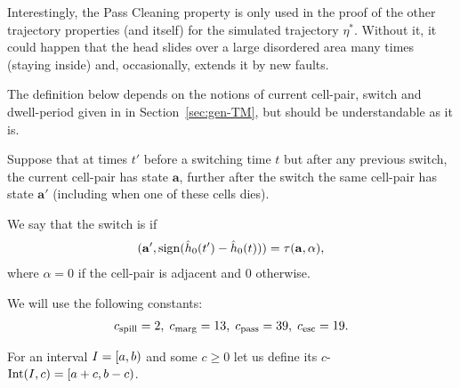 \documentclass[11pt]{memoir}
\theoremstyle{definition} %
\renewcommand{\ge}{\geq}
\renewcommand{\vek}[1]{\mathbf{#1}}
\newcommand{\va}{\vek{a}} %
\newcommand{\hc}{\hat h}
\newcommand{\Int}{\mathrm{Int}} %
\newcommand{\cns}[1]{c_{\textrm{\upshape #1}}}
\newcommand{\CEsc}{\cns{esc}}
\newcommand{\CMarg}{\cns{marg}}
\newcommand{\CPass}{\cns{pass}}
\newcommand{\CSpill}{\cns{spill}}
\begin{document}
Interestingly, the Pass Cleaning property is only used in the proof of the other trajectory properties
(and itself) for the simulated trajectory \( \eta^{*} \).
Without it, it could happen that
the head slides over a large disordered area many times (staying inside) and, occasionally,
extends it by new faults.

The definition below depends on the notions of current cell-pair, switch and dwell-period given in
 in Section~\ref{sec:gen-TM}, but should be understandable as it is.

\begin{definition}
Suppose that at times \( t' \) before a switching time \( t \) but after 
any previous switch, the current cell-pair has state \( \va \),
further after the switch the same cell-pair has state \( \va' \)
(including when one of these cells dies).

We say that the switch is  if
\begin{align*}
 (\va',\sign(\hc_{0}(t')-\hc_{0}(t))) =  \tau(\va,\alpha),
\end{align*}
where \( \alpha=0 \) if the cell-pair is adjacent and 0 otherwise.
\end{definition}

We will use the following constants:
\begin{align}\label{eq:cns.traj}
  \CSpill =2,\;
  \CMarg = 13,\;
  \CPass = 39,\;
  \CEsc = 19.
 \end{align}


  For an interval \( I=\left[a,b\right) \) and some \( c\ge 0 \) let us define its \( c \)-
  \(  \Int(I,c) = \lint{a+c}{b-c} \).
\end{document}
